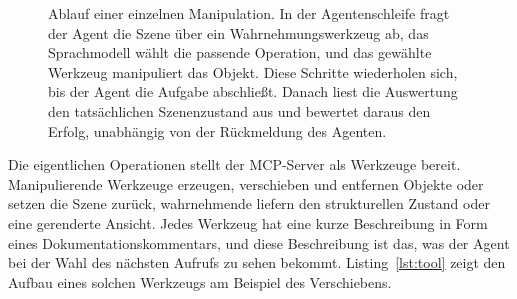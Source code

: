 \begin{figure}[htbp]
  \centering
  \caption{Ablauf einer einzelnen Manipulation. In der Agentenschleife fragt der Agent die Szene über ein Wahrnehmungswerkzeug ab, das Sprachmodell wählt die passende Operation, und das gewählte Werkzeug manipuliert das Objekt. Diese Schritte wiederholen sich, bis der Agent die Aufgabe abschließt. Danach liest die Auswertung den tatsächlichen Szenenzustand aus und bewertet daraus den Erfolg, unabhängig von der Rückmeldung des Agenten.}
  \label{fig:zyklus}
\end{figure}

Die eigentlichen Operationen stellt der MCP-Server als Werkzeuge bereit.
Manipulierende Werkzeuge erzeugen, verschieben und entfernen Objekte oder setzen die Szene zurück, wahrnehmende liefern den strukturellen Zustand oder eine gerenderte Ansicht.
Jedes Werkzeug hat eine kurze Beschreibung in Form eines Dokumentationskommentars, und diese Beschreibung ist das, was der Agent bei der Wahl des nächsten Aufrufs zu sehen bekommt.
Listing~\ref{lst:tool} zeigt den Aufbau eines solchen Werkzeugs am Beispiel des Verschiebens.

